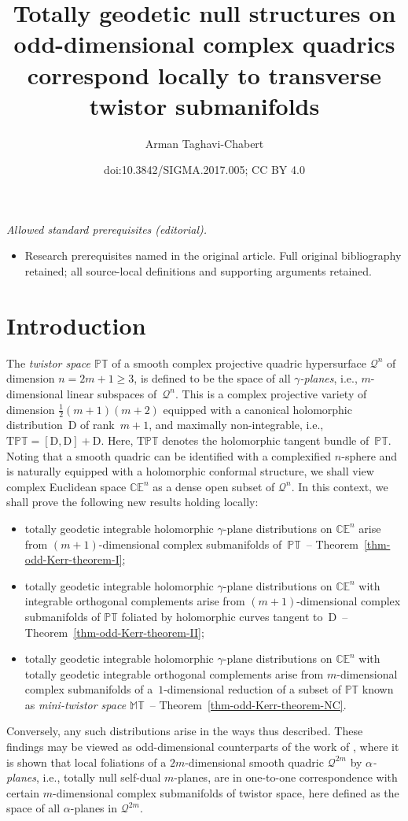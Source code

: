 \documentclass[10pt,a4paper]{amsart}
\title{Totally geodetic null structures on odd-dimensional complex quadrics correspond locally to transverse twistor submanifolds}
\author{Arman Taghavi-Chabert}
\date{doi:10.3842/SIGMA.2017.005; CC BY 4.0}
\numberwithin{equation}{section}
\newcommand{\mc} [1]{\mathcal{#1}}
\newcommand{\Drm} {{\mathrm{D}}}
\newcommand{\Tgt} {\mathrm{T}}
\newcommand{\PT} {\mathbb{PT}}
\newcommand{\T} {\mathbb{T}}
\newcommand{\E} {\mathbb{E}}
\newcommand{\M} {\mathbb{M}}
\newcommand{\C} {\mathbb{C}}
\begin{document}
\maketitle
\noindent\textit{Allowed standard prerequisites (editorial).}\begin{itemize}
\item Research prerequisites named in the original article. Full original bibliography retained; all source-local definitions and supporting arguments retained.
\end{itemize}\medskip
\section{Introduction}
The \emph{twistor space $\PT$} of a smooth complex projective quadric hypersurface $\mc{Q}^n$ of dimension $n=2m+1 \geq 3$, is def\/ined to be the space of all \emph{$\gamma$-planes}, i.e., $m$-dimensional linear subspaces of~$\mc{Q}^n$. This is a complex projective variety of dimension $\frac{1}{2}(m+1)(m+2)$ equipped with a canonical holomorphic distribution~$\mathrm{D}$ of rank~$m+1$, and maximally non-integrable, i.e., $\Tgt \PT = [ \mathrm{D} , \mathrm{D} ] + \mathrm{D}$. Here, $\Tgt \PT$ denotes the holomorphic tangent bundle of~$\PT$. Noting that a smooth quadric can be identif\/ied with a complexif\/ied $n$-sphere and is naturally equipped with a holomorphic conformal structure, we shall view complex Euclidean space $\C \E^n$ as a dense open subset of $\mc{Q}^n$. In this context, we shall prove the following new results holding locally:
\begin{itemize}\itemsep=0pt
\item totally geodetic integrable holomorphic $\gamma$-plane distributions on $\C \E^n$ arise from $(m+1)$-dimensional complex submanifolds of~$\PT$~-- Theorem~\ref{thm-odd-Kerr-theorem-I};
\item totally geodetic integrable holomorphic $\gamma$-plane distributions on $\C \E^n$ with integrable orthogonal complements arise from $(m+1)$-dimensional complex submanifolds of $\PT$ foliated by holomorphic curves tangent to~$\Drm$~-- Theorem~\ref{thm-odd-Kerr-theorem-II};
\item totally geodetic integrable holomorphic $\gamma$-plane distributions on $\C \E^n$ with totally geodetic integrable orthogonal complements arise from $m$-dimensional complex submanifolds of a~$1$-dimensional reduction of a subset of $\PT$ known as \emph{mini-twistor space $\M\T$}~-- Theorem~\ref{thm-odd-Kerr-theorem-NC}.
\end{itemize}
Conversely, any such distributions arise in the ways thus described. These f\/indings may be viewed as odd-dimensional counterparts of the work of \cite{Hughston1988}, where it is shown that local foliations of a $2m$-dimensional smooth quadric $\mc{Q}^{2m}$ by \emph{$\alpha$-planes}, i.e., totally null self-dual $m$-planes, are in one-to-one correspondence with certain $m$-dimensional complex submanifolds of twistor space, here def\/ined as the space of all $\alpha$-planes in $\mc{Q}^{2m}$.
\end{document}
